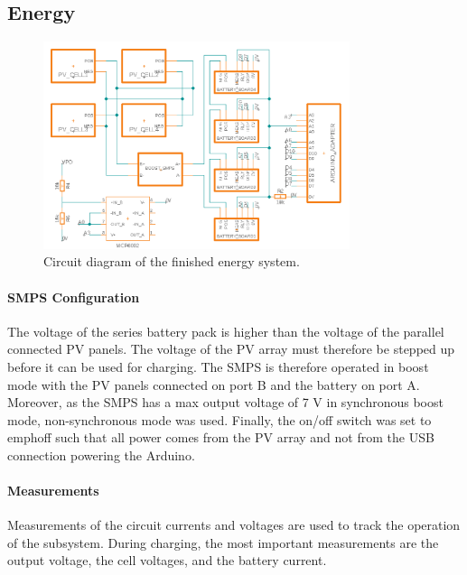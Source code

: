 \documentclass[a4paper]{article}
\begin{document}
\subsection{Energy}
\vspace{-10pt}
\begin{figure}[H]
    \centering
    \includegraphics[width=0.8\textwidth]{Circuit_Diagram.png}
    \caption{Circuit diagram of the finished energy system.}
    \label{fig:circuitDiagram}
\end{figure}
\paragraph*{SMPS Configuration}
\vspace{-6pt}
The voltage of the series battery pack is higher than the voltage of 
the parallel connected PV panels. The voltage of the PV array must 
therefore be stepped up before it can be used for charging. The SMPS 
is therefore operated in boost mode with the PV panels connected on 
port B and the battery on port A. Moreover, as the SMPS has a max 
output voltage of 7 V in synchronous boost mode\cite{powerLogbook}, 
non-synchronous mode was used. Finally, the on/off switch was set 
to emph{off} such that all power comes from the PV array and not 
from the USB connection powering the Arduino.

\paragraph*{Measurements}
\vspace{-6pt}
Measurements of the circuit currents and voltages are used to track the 
operation of the subsystem. During charging, the most important measurements 
are the output voltage, the cell voltages, and the battery current.
\end{document}
